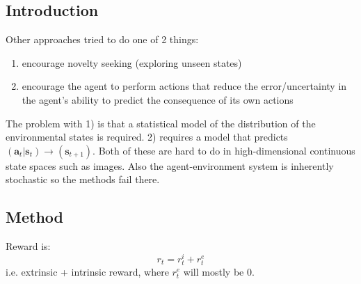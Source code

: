 \documentclass{article}
\begin{document}
\subsection{Introduction}
Other approaches tried to do one of 2 things:
\begin{enumerate}
		\item encourage novelty seeking (exploring unseen states)
		\item encourage the agent to perform actions that reduce the error/uncertainty in the agent's
				ability to predict the consequence of its own actions
\end{enumerate}
The problem with 1) is that a statistical model of the distribution of the environmental states
is required.
2) requires a model that predicts $ (\bm{a}_{t}| \bm{s}_{t} ) \to (\bm{s}_{t+1})  $.
Both of these are hard to do in high-dimensional continuous state spaces such as images.
Also the agent-environment system is inherently stochastic
so the methods fail there.

\subsection{Method}
Reward is:
\begin{equation}
		r_{ t } = r_{ t }^{ i } + r_{ t }^{ e }
\end{equation}
i.e. extrinsic + intrinsic reward, where $ r_{ t }^{ e }  $
will mostly be 0.
\end{document}
